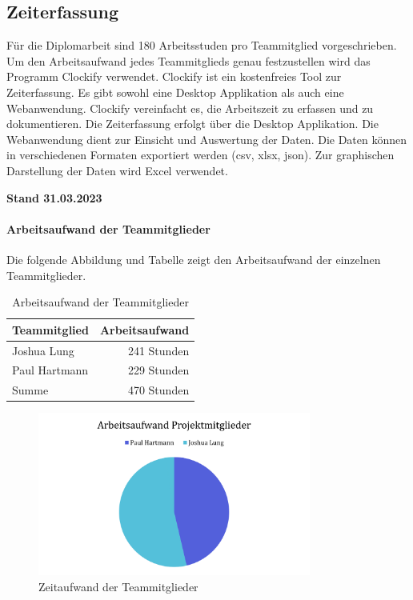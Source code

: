 \subsection{Zeiterfassung}
Für die Diplomarbeit sind 180 Arbeitsstuden pro Teammitglied vorgeschrieben. Um den Arbeitsaufwand jedes Teammitglieds genau festzustellen wird das Programm Clockify verwendet. Clockify ist ein kostenfreies Tool zur Zeiterfassung. Es gibt sowohl eine Desktop Applikation als auch eine Webanwendung. Clockify vereinfacht es, die Arbeitszeit zu erfassen und zu dokumentieren. Die Zeiterfassung erfolgt über die Desktop Applikation. Die Webanwendung dient zur Einsicht und Auswertung der Daten. Die Daten können in verschiedenen Formaten exportiert werden (csv, xlsx, json). Zur graphischen Darstellung der Daten wird Excel verwendet.

\textbf{Stand 31.03.2023}

\paragraph{Arbeitsaufwand der Teammitglieder}
Die folgende Abbildung und Tabelle zeigt den Arbeitsaufwand der einzelnen Teammitglieder.

\begin{table}[H]
  \centering
  \begin{tabular}{lr}
    \toprule
    \textbf{Teammitglied} & \textbf{Arbeitsaufwand} \\
    \midrule
    Joshua Lung           & 241 Stunden             \\
    Paul Hartmann         & 229 Stunden             \\
    \midrule
    Summe                 & 470 Stunden             \\
    \bottomrule
  \end{tabular}
  \caption{Arbeitsaufwand der Teammitglieder}
  \label{tab:zeiterfassung_teammitglieder}
\end{table}

\begin{figure}[H]
  \centering
  \includegraphics[width=0.8\textwidth]{images/zeiterfassung_teammitglieder.png}
  \caption{Zeitaufwand der Teammitglieder}
  \label{fig:zeiterfassung_teammitglieder}
\end{figure}


